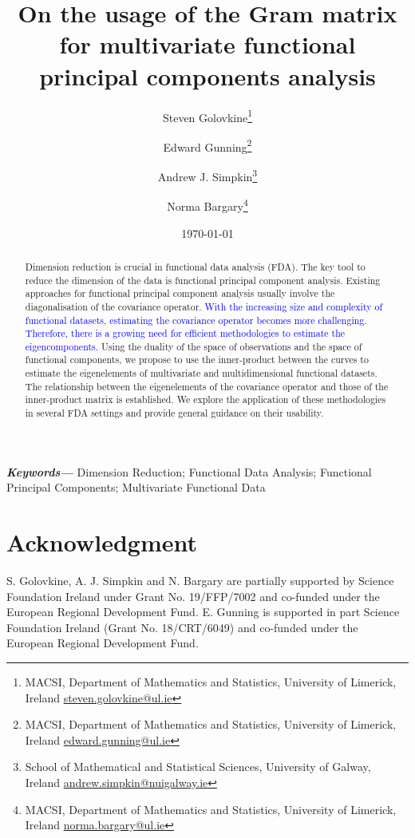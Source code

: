 \documentclass{article}
\title{On the usage of the Gram matrix for multivariate functional principal components analysis}
\author{%
Steven Golovkine\thanks{MACSI, Department of Mathematics and Statistics, University of Limerick, Ireland \href{mailto:steven.golovkine@ul.ie}{steven.golovkine@ul.ie}}
\and
Edward Gunning\thanks{MACSI, Department of Mathematics and Statistics, University of Limerick, Ireland \href{mailto:edward.gunning@ul.ie}{edward.gunning@ul.ie}}
\and
Andrew J. Simpkin\thanks{School of Mathematical and Statistical Sciences, University of Galway, Ireland \href{mailto:andrew.simpkin@nuigalway.ie}{andrew.simpkin@nuigalway.ie}}
\and
Norma Bargary\thanks{MACSI, Department of Mathematics and Statistics, University of Limerick, Ireland \href{mailto:norma.bargary@ul.ie}{norma.bargary@ul.ie}}
}
\date{\today}
\newcommand{\add}[1]{\textcolor{blue}{#1}}
\newcounter{th}
\providecommand{\keywords}[1]{\textbf{\textit{Keywords---}} #1}
\begin{document}
\maketitle

\begin{abstract}
Dimension reduction is crucial in functional data analysis (FDA). The key tool to reduce the dimension of the data is functional principal component analysis. Existing approaches for functional principal component analysis usually involve the diagonalisation of the covariance operator. \add{With the increasing size and complexity of functional datasets, estimating the covariance operator becomes more challenging. Therefore, there is a growing need for efficient methodologies to estimate the eigencomponents.} Using the duality of the space of observations and the space of functional components, we propose to use the inner-product between the curves to estimate the eigenelements of multivariate and multidimensional functional datasets. The relationship between the eigenelements of the covariance operator and those of the inner-product matrix is established. We explore the application of these methodologies in several FDA settings and provide general guidance on their usability.
\end{abstract}

\keywords{Dimension Reduction; Functional Data Analysis; Functional Principal Components; Multivariate Functional Data}



% 












\appendix






\section*{Acknowledgment}

S. Golovkine, A. J. Simpkin and N. Bargary are partially supported by Science Foundation Ireland under Grant No. 19/FFP/7002 and co-funded under the European Regional Development Fund. E. Gunning is supported in part Science Foundation Ireland (Grant No. 18/CRT/6049) and co-funded under the European Regional Development Fund.



\end{document}
